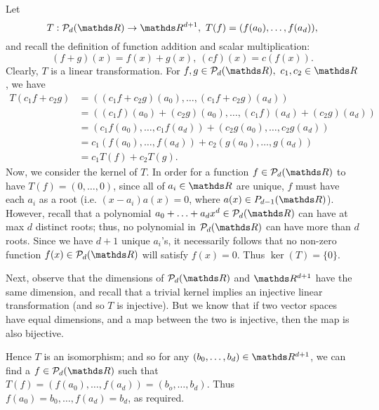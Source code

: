 \documentclass{homework}
\begin{document}
\begin{solution}
  Let \[
    T:\mc{P}_d(\R)\to \R^{d+1},\ T(f)=(f(a_0),\ldots,f(a_d))
  ,\] and recall the definition of function addition and scalar multiplication: \[
    (f+g)(x)=f(x)+g(x),\ (cf)(x)=c(f(x))
  .\] Clearly, $T$ is a linear transformation. For $f,g\in \mc{P}_d(\R),\ c_1,c_2\in \R$, we have
  \begin{align*}
    T(c_1f+c_2g)&=((c_1f+c_2g)(a_0),\ldots,(c_1f+c_2g)(a_d))\\
                &=((c_1f)(a_0)+(c_2g)(a_0),\ldots,(c_1f)(a_d)+(c_2g)(a_d))\\
                &=(c_1f(a_0),\ldots,c_1f(a_d))+(c_2g(a_0),\ldots,c_2g(a_d))\\
                &=c_1(f(a_0),\ldots,f(a_d))+c_2(g(a_0),\ldots,g(a_d))\\
                &=c_1T(f)+c_2T(g)
  .\end{align*}
  Now, we consider the kernel of $T$.  In order for a function $f\in \mc{P}_d(\R)$ to have
  $T(f)=(0,\ldots,0)$, since all of $a_i\in \R$ are unique, $f$ must have each $a_i$ as a root (i.e.
  $(x-a_i)a(x)=0$, where $a(x)\in P_{d-1}(\R)$). However, recall that a polynomial
  $a_0+\ldots+a_dx^d\in \mc{P}_d(\R)$ can have at max $d$ distinct roots; thus, no polynomial in
  $\mc{P}_d(\R)$ can have more than $d$ roots. Since we have $d+1$ unique $a_i$'s, it necessarily
  follows that no non-zero function $f(x)\in \mc{P}_d(\R)$ will satisfy $f(x)=0$. Thus $\ker(T)=\{ 0
  \}$.

  Next, observe that the dimensions of $\mc{P}_d(\R)$ and $\R^{d+1}$ have the same dimension, and
  recall that a trivial kernel implies an injective linear transformation (and so $T$ is injective).
  But we know that if two vector spaces have equal dimensions, and a map between the two is
  injective, then the map is also bijective.

  Hence $T$ is an isomorphism; and so for any $(b_0,\ldots,b_d)\in \R^{d+1}$, we can find a $f\in
  \mc{P}_d(\R)$ such that $T(f)=(f(a_0),\ldots,f(a_d))=(b_o,\ldots,b_d)$. Thus
  $f(a_0)=b_0,\ldots,f(a_d)=b_d$, as required.
\end{solution}
\end{document}
